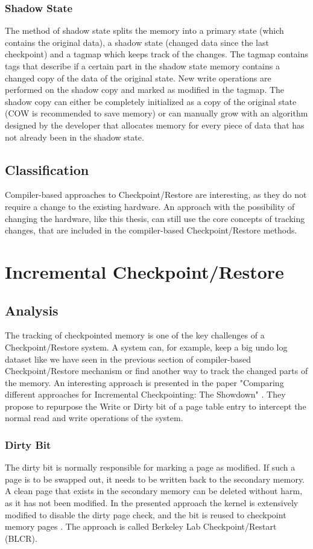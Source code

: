 \subsubsection{Shadow State}
The method of shadow state splits the memory into a primary state
(which contains the original data), a shadow state (changed data
since the last checkpoint) and a tagmap which keeps track of the
changes. The tagmap contains tags that describe if a certain
part in the shadow state memory contains a changed copy of the
data of the original state. New write operations are performed on
the shadow copy and marked as modified in the tagmap. The shadow copy
can either be completely initialized as a copy of the original
state (COW is recommended to save memory) or can manually grow
with an algorithm designed by the developer that allocates memory
for every piece of data that has not already been in the shadow
state.

\subsection{Classification}
Compiler-based approaches to Checkpoint/Restore are
interesting, as they do not require a change to the existing
hardware. An approach with the possibility of changing the hardware,
like this thesis, can still use the core concepts of tracking changes, that
are included in the compiler-based Checkpoint/Restore methods.

\section{Incremental Checkpoint/Restore}
\subsection{Analysis}
The tracking of checkpointed memory is one of the key challenges
of a Checkpoint/Restore system. A system can, for example, keep
a big undo log dataset like we have seen in the previous section
of compiler-based Checkpoint/Restore mechanism or find another way
to track the changed parts of the memory.
An interesting approach is presented in the paper "Comparing different approaches
for Incremental Checkpointing: The Showdown" \cite{Vasavada2011ComparingDA}.
They propose to repurpose the Write or Dirty bit of a page table entry
to intercept the normal read and write operations of the system.

\subsubsection{Dirty Bit}
The dirty bit is normally responsible for marking a page as modified.
If such a page is to be swapped out, it needs to be written back to the
secondary memory. A clean page that exists in the secondary memory
can be deleted without harm, as it has not been modified.
In the presented approach the kernel is extensively modified to disable
the dirty page check, and the bit is reused to checkpoint memory pages
\cite{Vasavada2011ComparingDA}.
The approach is called Berkeley Lab Checkpoint/Restart (BLCR).

